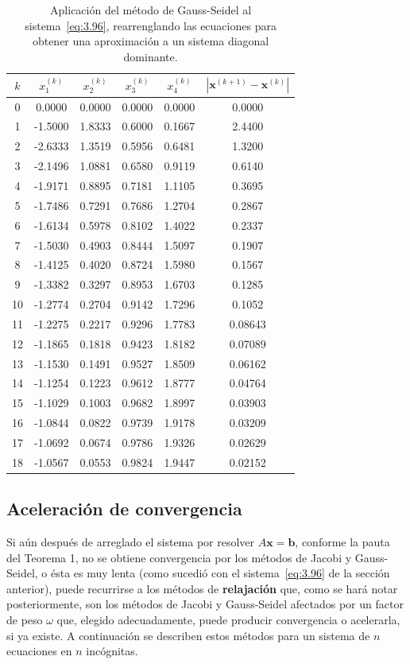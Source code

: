 \documentclass[12pt,letterpaper]{article}
\theoremstyle{definition}
\theoremstyle{plain}
\theoremstyle{remark}
\begin{document}
\begin{table}[h!]
\centering
\caption{Aplicación del método de Gauss-Seidel al sistema~\eqref{eq:3.96}, rearrenglando las ecuaciones para obtener una aproximación a un sistema diagonal dominante.}
\label{tab:3.4}
\begin{tabular}{c|c c c c|c}
$k$ & $x_1^{(k)}$ & $x_2^{(k)}$ & $x_3^{(k)}$ & $x_4^{(k)}$ & $|\mathbf{x}^{(k+1)} - \mathbf{x}^{(k)}|$ \\
\hline
0 & 0.0000 & 0.0000 & 0.0000 & 0.0000 & 0.0000 \\
1 & -1.5000 & 1.8333 & 0.6000 & 0.1667 & 2.4400 \\
2 & -2.6333 & 1.3519 & 0.5956 & 0.6481 & 1.3200 \\
3 & -2.1496 & 1.0881 & 0.6580 & 0.9119 & 0.6140 \\
4 & -1.9171 & 0.8895 & 0.7181 & 1.1105 & 0.3695 \\
5 & -1.7486 & 0.7291 & 0.7686 & 1.2704 & 0.2867 \\
6 & -1.6134 & 0.5978 & 0.8102 & 1.4022 & 0.2337 \\
7 & -1.5030 & 0.4903 & 0.8444 & 1.5097 & 0.1907 \\
8 & -1.4125 & 0.4020 & 0.8724 & 1.5980 & 0.1567 \\
9 & -1.3382 & 0.3297 & 0.8953 & 1.6703 & 0.1285 \\
10 & -1.2774 & 0.2704 & 0.9142 & 1.7296 & 0.1052 \\
11 & -1.2275 & 0.2217 & 0.9296 & 1.7783 & 0.08643 \\
12 & -1.1865 & 0.1818 & 0.9423 & 1.8182 & 0.07089 \\
13 & -1.1530 & 0.1491 & 0.9527 & 1.8509 & 0.06162 \\
14 & -1.1254 & 0.1223 & 0.9612 & 1.8777 & 0.04764 \\
15 & -1.1029 & 0.1003 & 0.9682 & 1.8997 & 0.03903 \\
16 & -1.0844 & 0.0822 & 0.9739 & 1.9178 & 0.03209 \\
17 & -1.0692 & 0.0674 & 0.9786 & 1.9326 & 0.02629 \\
18 & -1.0567 & 0.0553 & 0.9824 & 1.9447 & 0.02152
\end{tabular}
\end{table}

\subsection{Aceleración de convergencia}

Si aún después de arreglado el sistema por resolver $A \mathbf{x} = \mathbf{b}$, conforme la pauta del Teorema 1, no se obtiene convergencia por los métodos de Jacobi y Gauss-Seidel, o ésta es muy lenta (como sucedió con el sistema~\eqref{eq:3.96} de la sección anterior), puede recurrirse a los métodos de \textbf{relajación} que, como se hará notar posteriormente, son los métodos de Jacobi y Gauss-Seidel afectados por un factor de peso $\omega$ que, elegido adecuadamente, puede producir convergencia o acelerarla, si ya existe. A continuación se describen estos métodos para un sistema de $n$ ecuaciones en $n$ incógnitas.\\
\end{document}
